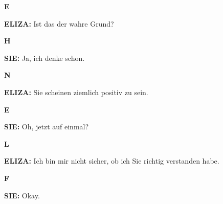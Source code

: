 \documentclass{article}
\begin{document}
\vspace{0.5cm}

\begin{minipage}[t]{0.13\textwidth}
  \centering
  {\bfseries\fontsize{14.4}{14.4}\selectfont\textcolor{pastelorange}{E}}
\end{minipage}%
\begin{minipage}[t]{0.81\textwidth}
  \textbf{ELIZA:} Ist das der wahre Grund?
\end{minipage}

\vspace{0.5cm}

\begin{minipage}[t]{0.13\textwidth}
  \centering
  {\bfseries\fontsize{14.4}{14.4}\selectfont\textcolor{pastelorange}{H}}
\end{minipage}%
\begin{minipage}[t]{0.81\textwidth}
  \textbf{SIE:} Ja, ich denke schon.
\end{minipage}

\vspace{0.5cm}

\begin{minipage}[t]{0.13\textwidth}
  \centering
  {\bfseries\fontsize{14.4}{14.4}\selectfont\textcolor{pastelorange}{N}}
\end{minipage}%
\begin{minipage}[t]{0.81\textwidth}
  \textbf{ELIZA:} Sie scheinen ziemlich positiv zu sein.
\end{minipage}

\vspace{0.5cm}

\begin{minipage}[t]{0.13\textwidth}
  \centering
  {\bfseries\fontsize{14.4}{14.4}\selectfont\textcolor{pastelorange}{E}}
\end{minipage}%
\begin{minipage}[t]{0.81\textwidth}
  \textbf{SIE:} Oh, jetzt auf einmal?
\end{minipage}

\vspace{0.5cm}

\begin{minipage}[t]{0.13\textwidth}
  \centering
  {\bfseries\fontsize{14.4}{14.4}\selectfont\textcolor{pastelorange}{L}}
\end{minipage}%
\begin{minipage}[t]{0.81\textwidth}
  \textbf{ELIZA:} Ich bin mir nicht sicher, ob ich Sie richtig verstanden habe.
\end{minipage}

\vspace{0.5cm}

\begin{minipage}[t]{0.13\textwidth}
  \centering
  {\bfseries\fontsize{14.4}{14.4}\selectfont\textcolor{pastelorange}{F}}
\end{minipage}%
\begin{minipage}[t]{0.81\textwidth}
  \textbf{SIE:} Okay.
\end{minipage}

\vspace{0.5cm}
\end{document}
